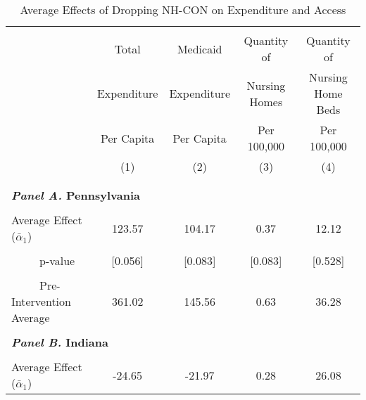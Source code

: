 \documentclass[../Main.tex]{subfiles}
\begin{document}


\newpage
\null
\vfill
\begin{table}[htbp]\centering \footnotesize
\def\sym#1{\ifmmode^{#1}\else\(^{#1}\)\fi}
\caption{Average Effects of Dropping NH-CON on Expenditure and Access}
\label{tab:ave_results}
\setlength{\tabcolsep}{10pt}
\begin{tabular}{l*{4}{c}}
\hline\hline
\\[-2ex]
&\multicolumn{1}{c}{Total}&\multicolumn{1}{c}{Medicaid}&\multicolumn{1}{c}{Quantity of}&\multicolumn{1}{c}{Quantity of}\\
&\multicolumn{1}{c}{Expenditure}&\multicolumn{1}{c}{Expenditure}&\multicolumn{1}{c}{Nursing Homes}&\multicolumn{1}{c}{Nursing Home Beds}\\
&\multicolumn{1}{c}{Per Capita}&\multicolumn{1}{c}{Per Capita}&\multicolumn{1}{c}{Per 100,000}&\multicolumn{1}{c}{Per 100,000}\\
&\multicolumn{1}{c}{(1)}&\multicolumn{1}{c}{(2)}&\multicolumn{1}{c}{(3)}&\multicolumn{1}{c}{(4)}\\
\\[-2ex]
\hline
\\[-.1ex]
\multicolumn{5}{l}{\textbf{\textit{Panel A.} Pennsylvania}}\\
\\[-1.5ex]
\multicolumn{1}{l}{Average Effect ($\bar{\alpha}_1$)}&   \multicolumn{1}{c}{123.57}&   \multicolumn{1}{c}{104.17}&  \multicolumn{1}{c}{0.37}&   \multicolumn{1}{c}{12.12}\\
\\[-2ex]
\multicolumn{1}{l}{\ \ \ \ \ p-value}  &\multicolumn{1}{c}{[0.056]}&\multicolumn{1}{c}{[0.083]}&\multicolumn{1}{c}{[0.083]}&\multicolumn{1}{c}{[0.528]}\\
\\[-2ex]
\multicolumn{1}{l}{\ \ \ \ \ Pre-Intervention Average}&   \multicolumn{1}{c}{361.02}&   \multicolumn{1}{c}{145.56}&   \multicolumn{1}{c}{0.63}&   \multicolumn{1}{c}{36.28}\\
\\[-.1ex]
\multicolumn{5}{l}{\textbf{\textit{Panel B.} Indiana}}\\
\\[-1.5ex]
\multicolumn{1}{l}{Average Effect ($\bar{\alpha}_1$)}&   \multicolumn{1}{c}{-24.65}&   \multicolumn{1}{c}{-21.97}&  \multicolumn{1}{c}{0.28}&   \multicolumn{1}{c}{26.08}\\

\end{tabular}
\end{table}
\end{document}
